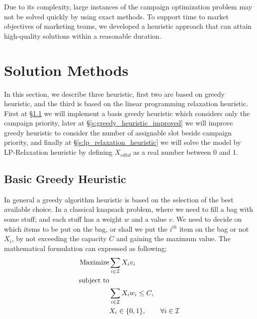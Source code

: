 \documentclass[11pt]{article}
\begin{document}
Due to its complexity, large instances of the campaign optimization problem may not be solved quickly by using exact methods. To support time to market objectives of marketing teams, we developed a heuristic approach that can attain high-quality solutions within a reasonable duration.


\section{Solution Methods}  \label{s:solution-method}

In this section, we describe three heuristic, first two are based on greedy heuristic, and the third is based on the linear programming relaxation heuristic. First at \S \ref{s:greedy_heuristic_basic} we will implement a basis greedy heuristic which considers only the campaign priority, later at \S \ref{s:greedy_heuristic_improved} we will improve greedy heuristic to consider the number of assignable slot beside campaign priority, and finally at \S \ref{s:lp_relaxation_heuristic} we will solve the model by LP-Relaxation heuristic by defining $X_{{c}{d}{h}{d}}$ as a real number between 0 and 1.

\subsection{Basic Greedy Heuristic} \label{s:greedy_heuristic_basic}
In general a greedy algorithm heuristic is based on the selection of the best available choice. In a classical knapsack problem, where we need to fill a bag with some stuff; and each stuff has a weight $w$ and a value $v$. We need to decide on which items to be put on the bag, or shall we put the $i^{th}$ item on the bag or not $X_{i}$, by not exceeding the capacity $C$ and gaining the maximum value. The mathematical formulation can expressed as following;
\begin{align*}
\text{Maximize} & \displaystyle
\sum\limits_{i\in \mathcal{I}} X_{i}  v_{i} \label{knapsack_mathmodel_obj}&\\
\text{subject to} \notag\\
&\sum\limits_{i\in \mathcal{I}}X_{i}  w_{i} \leq C, \label{knapsack_mathmodel_capacity}&\\
&X_{i} \in \{0,1\},&\forall i \in \mathcal{I} \label{knapsack_mathmodel_integrity}
\end{align*}\\
\end{document}
